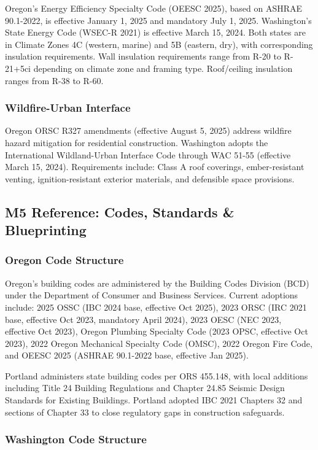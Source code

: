 \documentclass[11pt,letterpaper]{article}
\begin{document}
Oregon's Energy Efficiency Specialty Code (OEESC 2025), based on ASHRAE 90.1-2022, is effective January 1, 2025 and mandatory July 1, 2025. Washington's State Energy Code (WSEC-R 2021) is effective March 15, 2024. Both states are in Climate Zones 4C (western, marine) and 5B (eastern, dry), with corresponding insulation requirements. Wall insulation requirements range from R-20 to R-21+5ci depending on climate zone and framing type. Roof/ceiling insulation ranges from R-38 to R-60.

\subsubsection{Wildfire-Urban Interface}

Oregon ORSC R327 amendments (effective August 5, 2025) address wildfire hazard mitigation for residential construction. Washington adopts the International Wildland-Urban Interface Code through WAC 51-55 (effective March 15, 2024). Requirements include: Class A roof coverings, ember-resistant venting, ignition-resistant exterior materials, and defensible space provisions.

\subsection{M5 Reference: Codes, Standards \& Blueprinting}

\subsubsection{Oregon Code Structure}

Oregon's building codes are administered by the Building Codes Division (BCD) under the Department of Consumer and Business Services. Current adoptions include: 2025 OSSC (IBC 2024 base, effective Oct 2025), 2023 ORSC (IRC 2021 base, effective Oct 2023, mandatory April 2024), 2023 OESC (NEC 2023, effective Oct 2023), Oregon Plumbing Specialty Code (2023 OPSC, effective Oct 2023), 2022 Oregon Mechanical Specialty Code (OMSC), 2022 Oregon Fire Code, and OEESC 2025 (ASHRAE 90.1-2022 base, effective Jan 2025).

Portland administers state building codes per ORS 455.148, with local additions including Title 24 Building Regulations and Chapter 24.85 Seismic Design Standards for Existing Buildings. Portland adopted IBC 2021 Chapters 32 and sections of Chapter 33 to close regulatory gaps in construction safeguards.

\subsubsection{Washington Code Structure}
\end{document}
